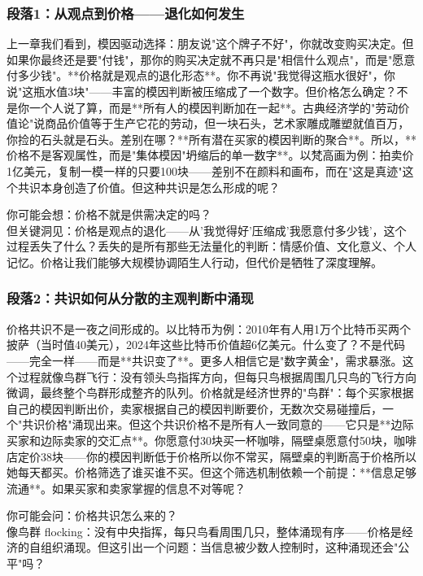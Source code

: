 \documentclass[a4paper,12pt]{book}
\begin{document}
	\subsubsection*{段落1：从观点到价格——退化如何发生}
	上一章我们看到，模因驱动选择：朋友说"这个牌子不好"，你就改变购买决定。但如果你最终还是要"付钱"，那你的购买决定就不再只是"相信什么观点"，而是"愿意付多少钱"。**价格就是观点的退化形态**。你不再说"我觉得这瓶水很好"，你说"这瓶水值3块"——丰富的模因判断被压缩成了一个数字。但价格怎么确定？不是你一个人说了算，而是**所有人的模因判断加在一起**。古典经济学的"劳动价值论"说商品价值等于生产它花的劳动，但一块石头，艺术家雕成雕塑就值百万，你捡的石头就是石头。差别在哪？**所有潜在买家的模因判断的聚合**。所以，**价格不是客观属性，而是"集体模因"坍缩后的单一数字**。以梵高画为例：拍卖价1亿美元，复制一模一样的只要100块——差别不在颜料和画布，而在"这是真迹"这个共识本身创造了价值。但这种共识是怎么形成的呢？

	\begin{tcolorbox}[colback=yellow!5, title=\textit{读者行为预测}]
		你可能会想：价格不就是供需决定的吗？\\ 但关键洞见：价格是观点的退化——从'我觉得好'压缩成'我愿意付多少钱'，这个过程丢失了什么？丢失的是所有那些无法量化的判断：情感价值、文化意义、个人记忆。价格让我们能够大规模协调陌生人行动，但代价是牺牲了深度理解。
	\end{tcolorbox}

	\subsubsection*{段落2：共识如何从分散的主观判断中涌现}
	价格共识不是一夜之间形成的。以比特币为例：2010年有人用1万个比特币买两个披萨（当时值40美元），2024年这些比特币价值超6亿美元。什么变了？不是代码——完全一样——而是**共识变了**。更多人相信它是"数字黄金"，需求暴涨。这个过程就像鸟群飞行：没有领头鸟指挥方向，但每只鸟根据周围几只鸟的飞行方向微调，最终整个鸟群形成整齐的队列。价格就是经济世界的"鸟群"：每个买家根据自己的模因判断出价，卖家根据自己的模因判断要价，无数次交易碰撞后，一个"共识价格"涌现出来。但这个共识价格不是所有人一致同意的——它只是**边际买家和边际卖家的交汇点**。你愿意付30块买一杯咖啡，隔壁桌愿意付50块，咖啡店定价38块——你的模因判断低于价格所以你不常买，隔壁桌的判断高于价格所以她每天都买。价格筛选了谁买谁不买。但这个筛选机制依赖一个前提：**信息足够流通**。如果买家和卖家掌握的信息不对等呢？

	\begin{tcolorbox}[colback=yellow!5, title=\textit{读者行为预测}]
		你可能会问：价格共识怎么来的？\\ 像鸟群 flocking：没有中央指挥，每只鸟看周围几只，整体涌现有序——价格是经济的自组织涌现。但这引出一个问题：当信息被少数人控制时，这种涌现还会"公平"吗？
	\end{tcolorbox}
\end{document}
